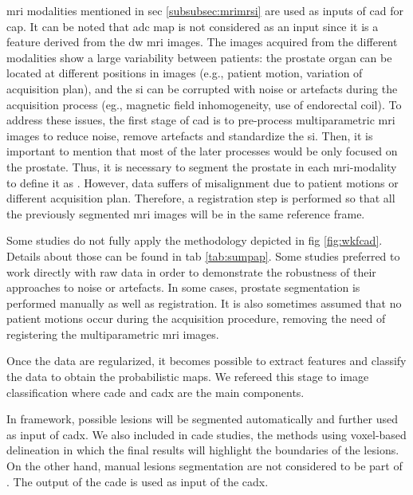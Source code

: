 \ac{mri} modalities mentioned in \acs{sec} \ref{subsubsec:mrimrsi} are used as inputs of \ac{cad} for \ac{cap}. It can be noted that \ac{adc} map is not considered as an input since it is a feature derived from the \ac{dw} \ac{mri} images. The images acquired from the different modalities show a large variability between patients: the prostate organ can be located at different positions in images (e.g., patient motion, variation of acquisition plan), and the \ac{si} can be corrupted with noise or artefacts during the acquisition process (eg., magnetic field inhomogeneity, use of endorectal coil). To address these issues, the first stage of \ac{cad} is to pre-process multiparametric \ac{mri} images to reduce noise, remove artefacts and standardize the \ac{si}. Then, it is important to mention that most of the later processes would be only focused on the prostate. Thus, it is necessary to segment the prostate in each \ac{mri}-modality to define it as . However, data suffers of misalignment due to patient motions or different acquisition plan. Therefore, a registration step is performed so that all the previously segmented \ac{mri} images will be in the same reference frame.

Some studies do not fully apply the methodology depicted in \acs{fig} \ref{fig:wkfcad}. Details about those can be found in \acs{tab} \ref{tab:sumpap}. Some studies preferred to work directly with raw data in order to demonstrate the robustness of their approaches to noise or artefacts. In some cases, prostate segmentation is performed manually as well as registration. It is also sometimes assumed that no patient motions occur during the acquisition procedure, removing the need of registering the multiparametric \ac{mri} images.

Once the data are regularized, it becomes possible to extract features and classify the data to obtain the probabilistic maps. We refereed this stage to image classification where \ac{cade} and \ac{cadx} are the main components. 

In  framework, possible lesions will be segmented automatically and further used as input of \ac{cadx}. We also included in \ac{cade} studies, the methods using voxel-based delineation in which the final results will highlight the boundaries of the lesions. On the other hand, manual lesions segmentation are not considered to be part of . The output of the \ac{cade} is used as input of the \ac{cadx}.

